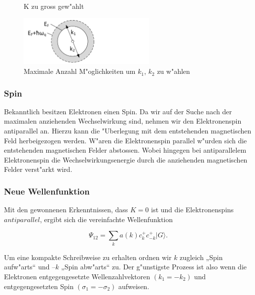 \begin{refsection}
\begin{figure}
\caption{K zu gross gew"ahlt
\label{supraleitung:kRaum_06}}
\end{figure}
\begin{figure}	
\centering
\includegraphics[width=0.6\textwidth]{supraleitung/kGraphic_09.png} %
\caption{Maximale Anzahl M"oglichkeiten um $k_1$, $k_2$ zu w"ahlen
\label{supraleitung:kRaum_09}}
\end{figure}

\subsubsection{Spin}
Bekanntlich besitzen Elektronen einen Spin. Da wir auf der Suche nach der maximalen anziehenden Wechselwirkung sind, nehmen wir den Elektronenspin antiparallel an. Hierzu kann die "Uberlegung mit dem entstehenden magnetischen Feld herbeigezogen werden. W"aren die Elektronenspin parallel w"urden sich die entstehenden magnetischen Felder abstossen. Wobei hingegen bei antiparallelem Elektronenspin die Wechselwirkungsenergie durch die anziehenden magnetischen Felder verst"arkt wird.

\subsubsection{Neue Wellenfunktion}
Mit den gewonnenen Erkenntnissen, dass $K=0$ ist und die Elektronenspins $antiparallel$, ergibt sich die vereinfachte Wellenfunktion

\[
\Psi_{12}=\sum \limits_{k} a(k)c^+_{k}c^+_{-k}|G\rangle.
\]

Um eine kompakte Schreibweise zu erhalten ordnen wir $k$ zugleich „Spin aufw"arts“ und $–k$ „Spin abw"arts“ zu. Der g"unstigste Prozess ist also wenn die Elektronen entgegengesetzte Wellenzahlvektoren $(k_1 = -k_2)$ und entgegengesetzten Spin $(\sigma_1 = -\sigma_2)$ aufweisen.
\\
\\
\printbibliography[heading=subbibliography]
\end{refsection}

